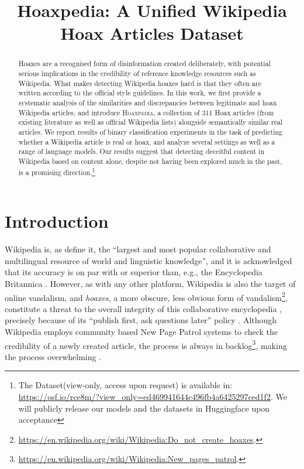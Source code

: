 
\title{Hoaxpedia: A Unified Wikipedia Hoax Articles Dataset}
\maketitle
\begin{abstract}
Hoaxes are a recognised form of disinformation created deliberately, with potential serious implications in the credibility of reference knowledge resources such as Wikipedia. What makes detecting Wikipedia hoaxes hard is that they often are written according to the official style guidelines. In this work, we first provide a systematic analysis of the similarities and discrepancies between legitimate and hoax Wikipedia articles, and introduce \textsc{Hoaxpedia}, a collection of 311 Hoax articles (from existing literature as well as official Wikipedia lists) alongside semantically similar real articles. We report results of binary classification experiments in the task of predicting whether a Wikipedia article is real or hoax, and analyze several settings as well as a range of language models. Our results suggest that detecting deceitful content in Wikipedia based on content alone, despite not having been explored much in the past, is a promising direction.\footnote{The Dataset(view-only, access upon request) is available in: \url{https://osf.io/rce8m/?view_only=ed469941644c496fb4a6425297ced1f2}. We will publicly release our models and the datasets in Huggingface upon acceptance} \end{abstract}

\section{Introduction}

Wikipedia is, as \citet{hovy2013collaboratively} define it, the ``largest and most popular collaborative and multilingual resource of world and linguistic knowledge'', and it is acknowledged that its accuracy is on par with or superior than, e.g., the Encyclopedia Britannica \cite{giles2005special}. However, as with any other platform, Wikipedia is also the target of online vandalism, and \textit{hoaxes}, a more obscure, less obvious form of vandalism\footnote{\url{https://en.wikipedia.org/wiki/Wikipedia:Do_not_create_hoaxes}.}, constitute a threat to the overall integrity of this collaborative encyclopedia \citep{kumar2016disinformation,wong2021wikireliability,wangmckeown2010got}, precisely because of its ``publish first, ask questions later'' policy \cite{asthana2018with}. Although Wikipedia employs community based New Page Patrol systems to check the credibility of a newly created article, the process is always in backlog\footnote{\url{https://en.wikipedia.org/wiki/Wikipedia:New_pages_patrol}.}, making the process overwhelming \cite{schinder2014accept}.


